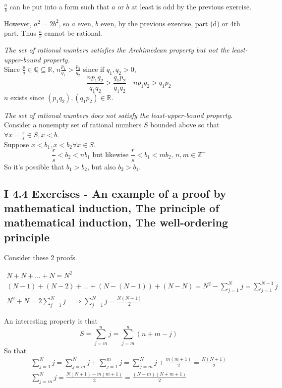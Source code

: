 \documentclass[twoside]{amsart}
\theoremstyle{plain}
\theoremstyle{definition}
\newcommand{\exercisehead}[1]
  {\smallskip
   \noindent{\small\bf Exercise #1.}}
\begin{document}
\exercisehead{11} $\frac{a}{b}$ can be put into a form such that $a$ or $b$ at least is odd by the previous exercise.  

However, $a^2=2b^2$, so $a$ even, $b$ even, by the previous exercise, part (d) or 4th part.  Thus $\frac{a}{b}$ cannot be rational.  

\exercisehead{12} \emph{ The set of rational numbers satisfies the Archimedean property but not the least-upper-bound property.}  \\
Since $\frac{p}{q} \in \mathbb{Q} \subseteq \mathbb{R}$, $n\frac{p_1}{q_1} > \frac{p_2}{q_2}$ since if $q_1,q_2 >0$, 
\[
\frac{n p_1 q_2}{q_1 q_2} > \frac{ q_1 p_2}{q_1 q_2}  \quad np_1 q_2 > q_1 p_2
\]
$n$ exists since $(p_1 q_2), (q_1 p_2) \in \mathbb{R}$.  

\emph{The set of rational numbers does not satisfy the least-upper-bound property}.  \\
Consider a nonempty set of rational numbers $S$ bounded above so that $\forall x = \frac{r}{s} \in S, x < b$.  \medskip \\
Suppose $x < b_1, x <b_2 \forall x \in S$.  
\[
\frac{r}{s} < b_2 < n b_1 \text{ but likewise } \frac{r}{s} < b_1 < m b_2 , \, n, m \in \mathbb{Z}^+
\]
So it's possible that $b_1 > b_2$, but also $b_2 > b_1$.  


\subsection*{ I 4.4 Exercises - An example of a proof by mathematical induction, The principle of mathematical induction, The well-ordering principle }

Consider these 2 proofs. 

\[
\begin{gathered}
  N + N + \dots + N  = N^2 \\
  (N-1) + (N-2) + \dots + (N-(N-1)) + (N-N) = N^2 -\sum_{j=1}^N j = \sum_{j=1}^{N-1} j \\
  N^2 + N = 2 \sum_{j=1}^N j \quad \Longrightarrow \sum_{j=1}^N j = \frac{ N(N+1)}{2}
\end{gathered}
\]

An interesting property is that 
\[
S = \sum_{j=m}^n j = \sum_{j=m}^n (n+m-j) 
\]
So that
\[
\begin{gathered}
  \sum_{j=1}^N j = \sum_{j=m}^N j + \sum_{j=1}^m j = \sum_{j=m}^N j + \frac{ m(m+1)}{2} = \frac{ N(N+1)}{2}  \\
  \sum_{j=m}^N j = \frac{ N(N+1) - m(m+1)}{2} = \frac{ (N-m)(N+m +1)}{2}
\end{gathered}
\]
\end{document}
